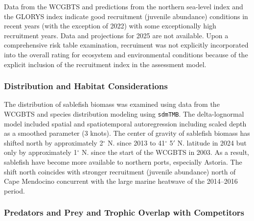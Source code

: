 \documentclass[
  english,
]{article}
\begin{document}
Data from the WCGBTS and predictions from the northern sea-level index
and the GLORYS index indicate good recruitment (juvenile abundance)
conditions in recent years (with the exception of 2022) with some
exceptionally high recruitment years. Data and projections for 2025 are
not available. Upon a comprehensive risk table examination, recruiment
was not explicitly incorporated into the overall rating for ecosystem
and environmental conditions because of the explicit inclusion of the
recruitment index in the assessment model.

\subsubsection{Distribution and Habitat
Considerations}\label{distribution-and-habitat-considerations}

The distribution of sablefish biomass was examined using data from the
WCGBTS and species distribution modeling using \texttt{sdmTMB}. The
delta-lognormal model included spatial and spatiotemporal autoregression
including scaled depth as a smoothed parameter (3 knots). The center of
gravity of sablefish biomass has shifted north by approximately
2\(^\circ\) N. since 2013 to 41\(^\circ\) 5\(\prime\) N. latitude in
2024 but only by approximately 1\(^\circ\) N. since the start of the
WCGBTS in 2003. As a result, sablefish have become more available to
northern ports, especially Astoria. The shift north coincides with
stronger recruitment (juvenile abundance) north of Cape Mendocino
concurrent with the large marine heatwave of the 2014--2016 period.

\subsubsection{Predators and Prey and Trophic Overlap with
Competitors}\label{predators-and-prey-and-trophic-overlap-with-competitors}
\end{document}
